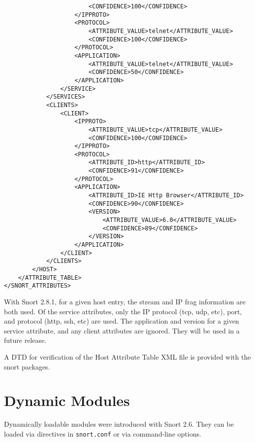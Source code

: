 \documentclass[english]{report}
\newenvironment{note}{
\samepage
    \vspace{10pt}{\textsf{
        {\hspace{7pt}\Huge{$\triangle$\hspace{-12.5pt}{\Large{$^!$}}}}\hspace{5pt}
        {\Large{NOTE}}
    }
    }
   \begin{center}
    \par\vspace{-17pt}

    \begin{lrbox}{\savepar}
    \begin{minipage}[r]{6in}
}
{
    \end{minipage}
    \end{lrbox}
    \fbox{
        \usebox{
            \savepar
	}
    }
    \par\vskip10pt
    \end{center}
}
\newenvironment{note}{
        \begin{rawhtml}
        <p><table border="1"><tr><td><b>
        Note:&nbsp;&nbsp;</b>
        \end{rawhtml}
}{
        \begin{rawhtml}
        </b></td></tr></table></p>
        \end{rawhtml}
}
\begin{document}
\begin{verbatim}
                        <CONFIDENCE>100</CONFIDENCE>
                    </IPPROTO>
                    <PROTOCOL>
                        <ATTRIBUTE_VALUE>telnet</ATTRIBUTE_VALUE>
                        <CONFIDENCE>100</CONFIDENCE>
                    </PROTOCOL>
                    <APPLICATION>
                        <ATTRIBUTE_VALUE>telnet</ATTRIBUTE_VALUE>
                        <CONFIDENCE>50</CONFIDENCE>
                    </APPLICATION>
                </SERVICE>
            </SERVICES>
            <CLIENTS>
                <CLIENT>
                    <IPPROTO>
                        <ATTRIBUTE_VALUE>tcp</ATTRIBUTE_VALUE>
                        <CONFIDENCE>100</CONFIDENCE>
                    </IPPROTO>
                    <PROTOCOL>
                        <ATTRIBUTE_ID>http</ATTRIBUTE_ID>
                        <CONFIDENCE>91</CONFIDENCE>
                    </PROTOCOL>
                    <APPLICATION>
                        <ATTRIBUTE_ID>IE Http Browser</ATTRIBUTE_ID>
                        <CONFIDENCE>90</CONFIDENCE>
                        <VERSION>
                            <ATTRIBUTE_VALUE>6.0</ATTRIBUTE_VALUE>
                            <CONFIDENCE>89</CONFIDENCE>
                        </VERSION>
                    </APPLICATION>
                </CLIENT>
            </CLIENTS>
        </HOST>
    </ATTRIBUTE_TABLE>
</SNORT_ATTRIBUTES>
\end{verbatim}

\begin{note}

With Snort 2.8.1, for a given host entry, the stream and IP frag information
are both used.  Of the service attributes, only the IP protocol (tcp, udp,
etc), port, and protocol (http, ssh, etc) are used.  The application and
version for a given service attribute, and any client attributes are ignored.
They will be used in a future release.

\end{note}

A DTD for verification of the Host Attribute Table XML file is provided with
the snort packages.

\section{Dynamic Modules}

Dynamically loadable modules were introduced with Snort 2.6.  They can be
loaded via directives in \texttt{snort.conf} or via command-line options.
\end{document}
